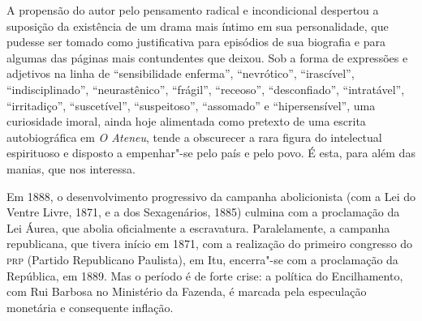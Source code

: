 A propensão do autor pelo pensamento radical e
incondicional despertou a suposição da existência de um drama mais
íntimo em sua personalidade, que pudesse ser tomado como justificativa
para episódios de sua biografia e para algumas das páginas mais
contundentes que deixou. Sob a forma de expressões e adjetivos na linha
de ``sensibilidade enferma'', ``nevrótico'', ``irascível'', ``indisciplinado'',
``neurastênico'', ``frágil'', ``receoso'', ``desconfiado'', ``intratável'',
``irritadiço'', ``suscetível'', ``suspeitoso'', ``assomado'' e ``hipersensível'',
uma curiosidade imoral, ainda hoje alimentada como pretexto de uma
escrita autobiográfica em \textit{O Ateneu},
tende a obscurecer a rara figura do intelectual espirituoso e disposto
a empenhar"-se pelo país e pelo povo. É esta, para além das manias,
que nos interessa.

Em 1888, o desenvolvimento progressivo da campanha abolicionista (com a
Lei do Ventre Livre, 1871, e a dos Sexagenários, 1885) culmina com a
proclamação da Lei Áurea, que abolia oficialmente a escravatura.
Paralelamente, a campanha republicana, que tivera início em 1871, com a
realização do primeiro congresso do \textsc{prp} (Partido Republicano Paulista),
em Itu, encerra"-se com a proclamação da República, em 1889. Mas o
período é de forte crise: a política do Encilhamento, com Rui Barbosa
no Ministério da Fazenda, é marcada pela especulação monetária e
consequente inflação.

